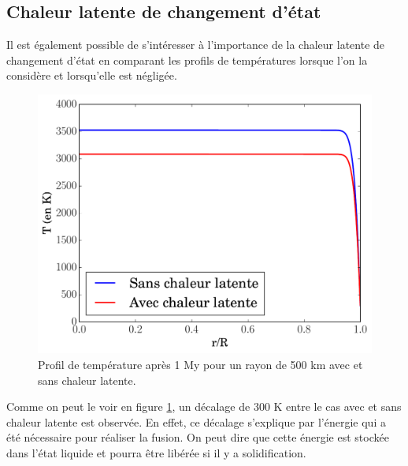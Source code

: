\documentclass[10pt,a4paper]{article}
\numberwithin{equation}{section}
\begin{document}
\newpage
\subsection{Chaleur latente de changement d'état}
\label{latente}

Il est également possible de s'intéresser à l'importance de la chaleur latente de changement d'état en comparant les profils de températures lorsque l'on la considère et lorsqu'elle est négligée.

\begin{figure}[h]
    \centering	    
	\includegraphics[scale=0.43]{figures/diffusion1.pdf}
    \caption{Profil de température après 1 My pour un rayon de 500 km avec et sans chaleur latente.}
    	\label{diffusion1} 
\end{figure}
\medskip

Comme on peut le voir en figure \ref{diffusion1}, un décalage de 300 K entre le cas avec et sans chaleur latente est observée. En effet, ce décalage s'explique par l'énergie qui a été nécessaire pour réaliser la fusion. On peut dire que cette énergie est stockée dans l'état liquide et pourra être libérée si il y a solidification.
\end{document}
